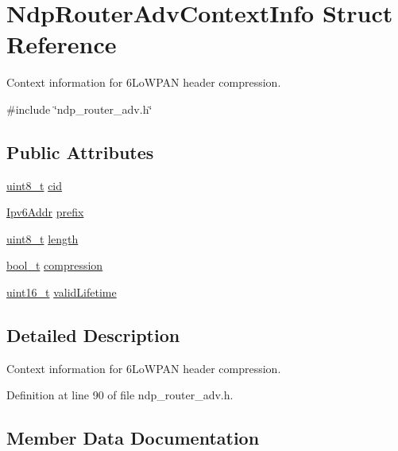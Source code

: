 \hypertarget{structNdpRouterAdvContextInfo}{}\section{Ndp\+Router\+Adv\+Context\+Info Struct Reference}
\label{structNdpRouterAdvContextInfo}


Context information for 6\+Lo\+W\+P\+AN header compression.  




{\ttfamily \#include \char`\"{}ndp\+\_\+router\+\_\+adv.\+h\char`\"{}}

\subsection*{Public Attributes}
\begin{DoxyCompactItemize}
\item 
\hyperlink{stdint_8h_aba7bc1797add20fe3efdf37ced1182c5}{uint8\+\_\+t} \hyperlink{structNdpRouterAdvContextInfo_a30495a28a08b2451b106f54aa3b9df5b}{cid}
\item 
\hyperlink{ipv6_8h_aed0cbc40c61ed5b4fb681ebc55237e89}{Ipv6\+Addr} \hyperlink{structNdpRouterAdvContextInfo_ae47d34b00d47338fed35c5e16986d370}{prefix}
\item 
\hyperlink{stdint_8h_aba7bc1797add20fe3efdf37ced1182c5}{uint8\+\_\+t} \hyperlink{structNdpRouterAdvContextInfo_a5e0a643d6a47716044b3358716e23626}{length}
\item 
\hyperlink{compiler__port_8h_a812d16e5494522586b3784e55d479912}{bool\+\_\+t} \hyperlink{structNdpRouterAdvContextInfo_a5d3650aeff0c1ddc57fde542ada5529d}{compression}
\item 
\hyperlink{stdint_8h_a273cf69d639a59973b6019625df33e30}{uint16\+\_\+t} \hyperlink{structNdpRouterAdvContextInfo_abba7398773c7476c4969f3b31c90ac48}{valid\+Lifetime}
\end{DoxyCompactItemize}


\subsection{Detailed Description}
Context information for 6\+Lo\+W\+P\+AN header compression. 

Definition at line 90 of file ndp\+\_\+router\+\_\+adv.\+h.



\subsection{Member Data Documentation}
\mbox{\label{structNdpRouterAdvContextInfo_a30495a28a08b2451b106f54aa3b9df5b}} 

